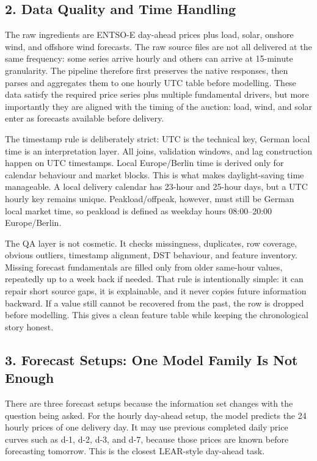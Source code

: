 \documentclass[10pt,a4paper]{article}
\begin{document}
\subsection*{2. Data Quality and Time Handling}
The raw ingredients are ENTSO-E day-ahead prices plus load, solar, onshore wind, and offshore wind forecasts. The raw source files are not all delivered at the same frequency: some series arrive hourly and others can arrive at 15-minute granularity. The pipeline therefore first preserves the native responses, then parses and aggregates them to one hourly UTC table before modelling. These data satisfy the required price series plus multiple fundamental drivers, but more importantly they are aligned with the timing of the auction: load, wind, and solar enter as forecasts available before delivery.

The timestamp rule is deliberately strict: UTC is the technical key, German local time is an interpretation layer. All joins, validation windows, and lag construction happen on UTC timestamps. Local Europe/Berlin time is derived only for calendar behaviour and market blocks. This is what makes daylight-saving time manageable. A local delivery calendar has 23-hour and 25-hour days, but a UTC hourly key remains unique. Peakload/offpeak, however, must still be German local market time, so peakload is defined as weekday hours 08:00--20:00 Europe/Berlin.

The QA layer is not cosmetic. It checks missingness, duplicates, row coverage, obvious outliers, timestamp alignment, DST behaviour, and feature inventory. Missing forecast fundamentals are filled only from older same-hour values, repeatedly up to a week back if needed. That rule is intentionally simple: it can repair short source gaps, it is explainable, and it never copies future information backward. If a value still cannot be recovered from the past, the row is dropped before modelling. This gives a clean feature table while keeping the chronological story honest.

\subsection*{3. Forecast Setups: One Model Family Is Not Enough}
There are three forecast setups because the information set changes with the question being asked. For the hourly day-ahead setup, the model predicts the 24 hourly prices of one delivery day. It may use previous completed daily price curves such as d-1, d-2, d-3, and d-7, because those prices are known before forecasting tomorrow. This is the closest LEAR-style day-ahead task.
\end{document}
